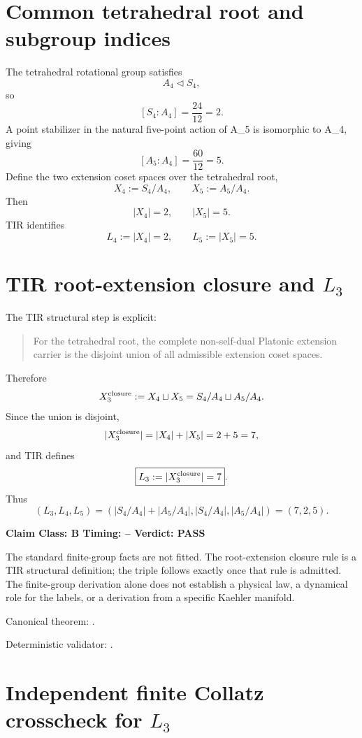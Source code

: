 \documentclass[11pt,a4paper,twoside]{book}
\def\({}%
\def\){}%
\theoremstyle{definition}
\newcommand{\vTwelveStatus}[3]{\par\noindent\textbf{Claim Class: #1 \quad Timing: #2 \quad Verdict: #3}\par}
\begin{document}
\section{Common tetrahedral root and subgroup indices}

The tetrahedral rotational group satisfies
\[
A_4\triangleleft S_4,
\]
so
\[
\boxed{[S_4:A_4]=\frac{24}{12}=2}.
\]
A point stabilizer in the natural five-point action of \(A_5\) is isomorphic to
\(A_4\), giving
\[
\boxed{[A_5:A_4]=\frac{60}{12}=5}.
\]
Define the two extension coset spaces over the tetrahedral root,
\[
X_4:=S_4/A_4,
\qquad
X_5:=A_5/A_4.
\]
Then
\[
|X_4|=2,
\qquad
|X_5|=5.
\]
TIR identifies
\[
\boxed{L_4:=|X_4|=2},
\qquad
\boxed{L_5:=|X_5|=5}.
\]

\section[TIR root-extension closure and L3]{TIR root-extension closure and $L_3$}

The TIR structural step is explicit:

\begin{quote}
For the tetrahedral root, the complete non-self-dual Platonic extension carrier
is the disjoint union of all admissible extension coset spaces.
\end{quote}

Therefore
\[
X_3^{\rm closure}:=X_4\sqcup X_5
=S_4/A_4\sqcup A_5/A_4.
\]
Since the union is disjoint,
\[
|X_3^{\rm closure}|=|X_4|+|X_5|=2+5=7,
\]
and TIR defines
\[
\boxed{L_3:=|X_3^{\rm closure}|=7}.
\]
Thus
\[
\boxed{
(L_3,L_4,L_5)
=\left(
|S_4/A_4|+|A_5/A_4|,
|S_4/A_4|,
|A_5/A_4|
\right)
=(7,2,5).
}
\]
\vTwelveStatus{B}{--}{PASS}

The standard finite-group facts are not fitted.  The root-extension closure
rule is a TIR structural definition; the triple follows exactly once that rule
is admitted.  The finite-group derivation alone does not establish a physical
law, a dynamical role for the labels, or a derivation from a specific Kaehler
manifold.

Canonical theorem:
.

Deterministic validator:
.

\section[Independent finite Collatz crosscheck for L3]{Independent finite Collatz crosscheck for $L_3$}
\end{document}
